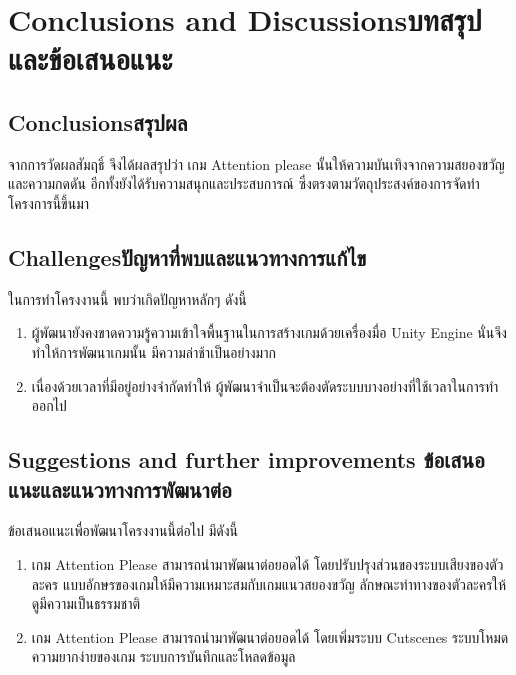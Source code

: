 \chapter{\ifenglish Conclusions and Discussions\else บทสรุปและข้อเสนอแนะ\fi}

\section{\ifenglish Conclusions\else สรุปผล\fi}
จากการวัดผลสัมฤธิ์ จึงได้ผลสรุปว่า เกม Attention please นั้นให้ความบันเทิงจากความสยองขวัญและความกดดัน อีกทั้งยังได้รับความสนุกและประสบการณ์ ซึ่งตรงตามวัตถุประสงค์ของการจัดทำโครงการนี้ขึ้นมา

\section{\ifenglish Challenges\else ปัญหาที่พบและแนวทางการแก้ไข\fi}

ในการทำโครงงานนี้ พบว่าเกิดปัญหาหลักๆ ดังนี้
\begin{enumerate}
    \item ผู้พัฒนายังคงขาดความรู้ความเข้าใจพื้นฐานในการสร้างเกมด้วยเครื่องมื่อ Unity Engine นั่นจึงทำให้การพัฒนาเกมนั้น มีความล่าช้าเป็นอย่างมาก
    \item เนื่องด้วยเวลาที่มีอยู่อย่างจำกัดทำให้ ผู้พัฒนาจำเป็นจะต้องตัดระบบบางอย่างที่ใช้เวลาในการทำ ออกไป
\end{enumerate}

\section{\ifenglish%
Suggestions and further improvements
\else%
ข้อเสนอแนะและแนวทางการพัฒนาต่อ
\fi
}

ข้อเสนอแนะเพื่อพัฒนาโครงงานนี้ต่อไป มีดังนี้
\begin{enumerate}
    \item เกม Attention Please สามารถนำมาพัฒนาต่อยอดได้ โดยปรับปรุงส่วนของระบบเสียงของตัวละคร แบบอักษรของเกมให้มีความเหมาะสมกับเกมแนวสยองขวัญ ลักษณะท่าทางของตัวละครให้ดูมีความเป็นธรรมชาติ
    \item เกม Attention Please สามารถนำมาพัฒนาต่อยอดได้ โดยเพิ่มระบบ Cutscenes ระบบโหมดความยากง่ายของเกม ระบบการบันทึกและโหลดข้อมูล
\end{enumerate}